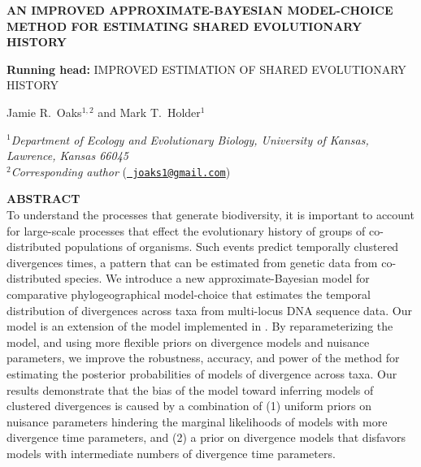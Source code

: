 \documentclass[letterpaper,12pt]{article}
\begin{document}
\doublespacing
\raggedright
\setlength{\parindent}{0.5in}
\begin{linenumbers}

\begin{titlepage}
    \begin{flushleft}
        \sffamily

        \MakeUppercase{\large\bfseries An Improved Approximate-Bayesian
            Model-choice Method for Estimating Shared Evolutionary History}

        \vspace{12pt}
        \textbf{Running head:} \MakeUppercase{Improved Estimation of Shared Evolutionary History}

        \vspace{12pt}
        Jamie R.\ Oaks$^{1,2}$ and Mark T.\ Holder$^{1}$

        \bigskip
        $^1$\emph{Department of Ecology and Evolutionary Biology,
            University of Kansas,
            Lawrence, Kansas 66045}\\[.1in]
        $^2$\emph{Corresponding author} (\href{mailto:joaks1@gmail.com}{\tt
        joaks1@gmail.com})\\

    \end{flushleft}
\end{titlepage}

{\sffamily
    \noindent\textbf{ABSTRACT} \\
    \noindent To understand the processes that generate biodiversity, it is
    important to account for large-scale processes that effect the evolutionary
    history of groups of co-distributed populations of organisms.
    Such events predict temporally clustered divergences times, a pattern
    that can be estimated from genetic data from co-distributed species.
    We introduce a new approximate-Bayesian model for comparative
    phylogeographical model-choice that estimates the temporal distribution of
    divergences across taxa from multi-locus DNA sequence data.
    Our model is an extension of the model implemented in \msb.
    By reparameterizing the model, and using more flexible priors on divergence
    models and nuisance parameters, we improve the robustness, accuracy, and power
    of the method for estimating the posterior probabilities of models
    of divergence across taxa.
    Our results demonstrate that the bias of the \msb model toward inferring
    models of clustered divergences is caused by a combination of (1) uniform
    priors on nuisance parameters hindering the marginal likelihoods of models
    with more divergence time parameters, and (2) a prior on divergence models
    that disfavors models with intermediate numbers of divergence time
    parameters.

}
\end{linenumbers}
\end{document}
